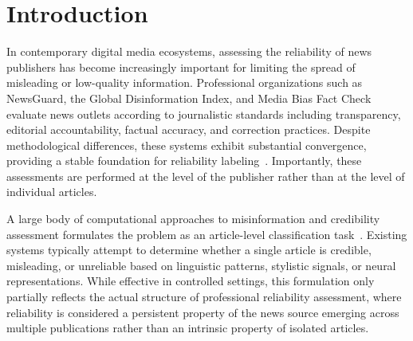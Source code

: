 \documentclass[journal]{IEEEtran}
\begin{document}



\section{Introduction}
In contemporary digital media ecosystems, assessing the reliability of news publishers has become increasingly important for limiting the spread of misleading or low-quality information. Professional organizations such as NewsGuard, the Global Disinformation Index, and Media Bias Fact Check evaluate news outlets according to journalistic standards including transparency, editorial accountability, factual accuracy, and correction practices. Despite methodological differences, these systems exhibit substantial convergence, providing a stable foundation for reliability labeling~\cite{lin2023high,DBLP:conf/icwsm/PratelliP22}. Importantly, these assessments are performed at the level of the publisher rather than at the level of individual articles.

A large body of computational approaches to misinformation and credibility assessment formulates the problem as an article-level classification task~\cite{pandolfi2020automatic,Przybyla2021plugin,DBLP:journals/corr/abs-2410-21360,DBLP:journals/dbsk/AdjiLS26}. Existing systems typically attempt to determine whether a single article is credible, misleading, or unreliable based on linguistic patterns, stylistic signals, or neural representations. While effective in controlled settings, this formulation only partially reflects the actual structure of professional reliability assessment, where reliability is considered a persistent property of the news source emerging across multiple publications rather than an intrinsic property of isolated articles.
\end{document}
